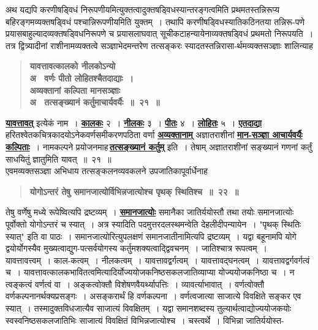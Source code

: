 \documentclass[11pt, openany]{book}
\begin{document}
\begin{sloppypar}
{\small अथ यद्यपि करणीषड्विधं निरूपणीयमित्युक्तत्वादुक्तषड्विधस्यान्तरङ्गत्वमिति प्रथमतस्तन्निरूप्य बहिरङ्गमव्यक्तषड्विधं पश्चान्निरूपणीयमिति युक्तम्~। तथापि करणीषड्विधस्यातिकठिनतया तन्निरू-पणे प्रयासबाहुल्यादव्यक्तषड्विधनिरूपणे च प्रयासलाघवात् सूचीकटाहन्यायेनाव्यक्तषड्विधं प्रथमतो निरूपयति~। तत्र द्वित्र्यादीनां राशीनामव्यक्तत्वे सञ्ज्ञाभेदमन्तरेण तत्सङ्करः स्यादतस्तन्निरासा-र्थमव्यक्तसञ्ज्ञाः शालिन्याह\textendash }

 \label{3.21}
\begin{quote}
{\large \textbf{{\color{purple}यावत्तावत्कालको नीलकोऽन्यो\\
{\color{white}अ} ~वर्णः पीतो लोहितश्चैतदाद्याः~।\\
अव्यक्तानां कल्पिता मानसञ्ज्ञाः\\
{\color{white}अ} ~तत्सङ्ख्यानं कर्तुमाचार्यवर्यैः~॥~२१~॥}}}
\end{quote}

\hyperref[3.21]{\textbf{यावत्तावत्}} इत्येकं नाम~। \hyperref[3.21]{\textbf{कालकः}} २~। \hyperref[3.21]{\textbf{नीलकः}} ३~। \hyperref[3.21]{\textbf{पीतः}} ४~। \hyperref[3.21]{\textbf{लोहितः}} ५~। \hyperref[3.21]{\textbf{एतदाद्या}} हरितश्वेतकचित्रकादयोऽनेकवर्णसमीकरणपठिता वर्णा \hyperref[3.21]{\textbf{अव्यक्तानाम्}} अज्ञातराशीनां \hyperref[3.21]{\textbf{मान-सञ्ज्ञा आचार्यवर्यैः कल्पिताः}}~। नामकल्पने प्रयोजनमाह\textendash \,\hyperref[3.21]{\textbf{तत्सङ्ख्यानं कर्तुम्}} इति~। तेषाम् अज्ञातराशीनां सङ्ख्यानं गणनां कर्तुं साधयितुं ज्ञातुमिति यावत्~॥~२१~॥\\

{\small एवमव्यक्तसञ्ज्ञा अभिधाय तत्सङ्कलनव्यवकलने उपजातिकापूर्वार्धेनाह\textendash }

 \label{3.22}
\begin{quote}
{\large \textbf{{\color{purple}योगोऽन्तरं तेषु समानजात्योर्विभिन्नजात्योश्च पृथक् स्थितिश्च~॥~२२~॥}}}
\end{quote}

तेषु वर्णेषु मध्ये रूपेष्वित्यपि द्रष्टव्यम्~। \hyperref[3.22]{\textbf{समानजात्योः}} समानैका जातिर्ययोस्तौ तथा तयोः समानजात्योः पूर्वोक्तो योगोऽन्तरं च स्यात्~। अत्र स्यादिति पदमुत्तरदलस्थमन्वेति देहलीदीपन्यायेन~। "पृथक् स्थितिः स्यात्" इति वा पाठः~। समानजात्योरित्युपलक्षणं समानजातीनामित्यपि द्रष्टव्यम्~। यद्वा बहूनामपि योगे द्वयोर्योगस्यैव मुख्यत्वाद्युग-पत्सर्वयोगस्य कर्तुमशक्यत्वाद्द्विवचनम्~। जातिश्चात्र रूपत्वम्~। यावत्तावत्त्वम्~। काल-कत्वम्~। नीलकत्वम्~। यावत्तावद्वर्गत्वम्~। यावत्तावद्घनत्वम्~। यावत्तावद्वर्गवर्गत्वं च~। यावत्तावत्कालकभावितत्वमित्यादिर्योज्ययोजकनिष्ठसकलजातिव्याप्या योज्ययोजकनिष्ठा च~। न त्वङ्कत्वं वर्णत्वं वा~। अङ्कत्वोक्तौ विशेषणवैयर्थ्यापत्तिः~। व्यावर्त्याभावात्~। वर्णत्वोक्तौ वर्णकल्पनानर्थक्यप्रसङ्गः~। असङ्करार्थं हि वर्णकल्पना~। वर्णत्वजात्या साजात्ये विवक्षिते सङ्कर एव स्यात्~। तस्मादुक्तविधजात्यैव साजात्यं विवक्षितम्~। यद्वा समानशब्दस्य तुल्यार्थत्वाद्योज्ययोजकयोः स्वस्वनिष्ठसकलजातिभिः साजात्यं विवक्षितं विभिन्नजात्योश्च~। चस्त्वर्थे~। विभिन्ना जातिर्ययोस्त- 
\end{sloppypar}
\end{document}

